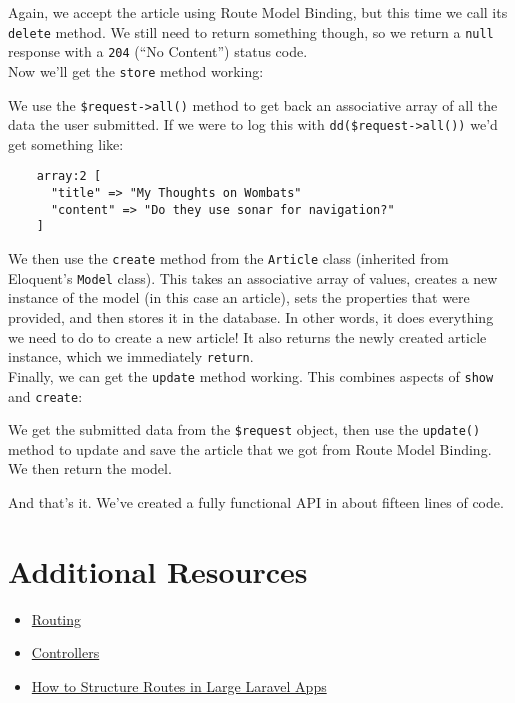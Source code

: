 Again, we accept the article using Route Model Binding, but this time we call its \texttt{delete} method. We still need to return something though, so we return a \texttt{null} response with a \texttt{204} (``No Content'') status code.
\\

Now we'll get the \texttt{store} method working:


We use the \texttt{\$request->all()} method to get back an associative array of all the data the user submitted. If we were to log this with \texttt{dd(\$request->all())} we'd get something like:

\begin{verbatim}
    array:2 [
      "title" => "My Thoughts on Wombats"
      "content" => "Do they use sonar for navigation?"
    ]
\end{verbatim}

We then use the \texttt{create} method from the \texttt{Article} class (inherited from Eloquent's \texttt{Model} class). This takes an associative array of values, creates a new instance of the model (in this case an article), sets the properties that were provided, and then stores it in the database. In other words, it does everything we need to do to create a new article! It also returns the newly created article instance, which we immediately \texttt{return}.
\\

Finally, we can get the \texttt{update} method working. This combines aspects of \texttt{show} and \texttt{create}:


We get the submitted data from the \texttt{\$request} object, then use the \texttt{update()} method to update and save the article that we got from Route Model Binding. We then return the model.

\hr

And that's it. We've created a fully functional API in about fifteen lines of code.


\section{Additional Resources}

\begin{itemize}[leftmargin=*]
    \item \href{https://laravel.com/docs/master/routing}{Routing}
    \item \href{http://laravel.com/docs/master/controllers}{Controllers}
    \item \href{https://laraveldaily.com/how-to-structure-routes-in-large-laravel-projects/}{How to Structure Routes in Large Laravel Apps}
\end{itemize}
